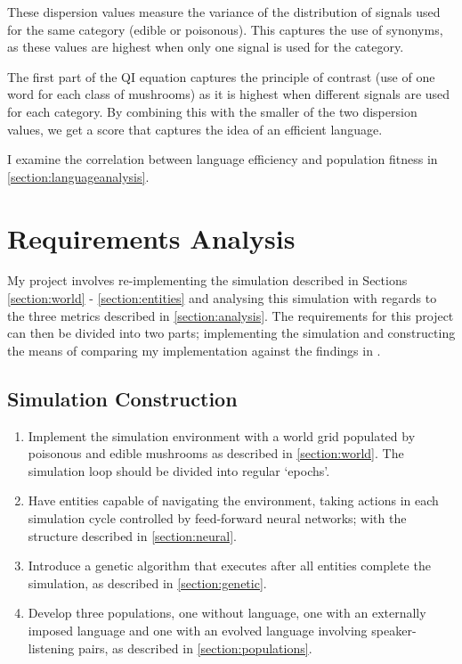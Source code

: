 \documentclass[12pt,a4paper]{report}
\begin{document}
These dispersion values measure the variance of the distribution of signals used for the same category (edible or poisonous). This captures the use of synonyms, as these values are highest when only one signal is used for the category. 

The first part of the QI equation captures the principle of contrast (use of one word for each class of mushrooms) as it is highest when different signals are used for each category. By combining this with the smaller of the two dispersion values, we get a score that captures the idea of an efficient language.

I examine the correlation between language efficiency and population fitness in \cref{section:languageanalysis}.


\section{Requirements Analysis}\label{section:requirements}

My project involves re-implementing the simulation described in Sections \ref{section:world} - \ref{section:entities} and analysing this simulation with regards to the three metrics described in \cref{section:analysis}. The requirements for this project can then be divided into two parts; implementing the simulation and constructing the means of comparing my implementation against the findings in \citet{Cangelosi1998}.

\subsection*{Simulation Construction}

\begin{enumerate}

\item Implement the simulation environment with a world grid populated by poisonous and edible mushrooms as described in \cref{section:world}. The simulation loop should be divided into regular `epochs'.

\item Have entities capable of navigating the environment, taking actions in each simulation cycle controlled by feed-forward neural networks; with the structure described in \cref{section:neural}.

\item Introduce a genetic algorithm that executes after all entities complete the simulation, as described in \cref{section:genetic}.

\item Develop three populations, one without language, one with an externally imposed language and one with an evolved language involving speaker-listening pairs, as described in \cref{section:populations}.

\end{enumerate}
\end{document}

